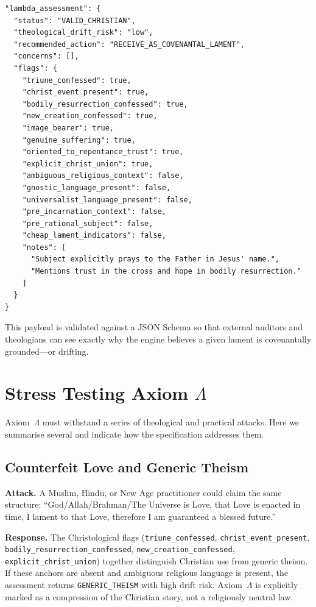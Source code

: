 \documentclass[11pt]{article}
\begin{document}
\begin{verbatim}
"lambda_assessment": {
  "status": "VALID_CHRISTIAN",
  "theological_drift_risk": "low",
  "recommended_action": "RECEIVE_AS_COVENANTAL_LAMENT",
  "concerns": [],
  "flags": {
    "triune_confessed": true,
    "christ_event_present": true,
    "bodily_resurrection_confessed": true,
    "new_creation_confessed": true,
    "image_bearer": true,
    "genuine_suffering": true,
    "oriented_to_repentance_trust": true,
    "explicit_christ_union": true,
    "ambiguous_religious_context": false,
    "gnostic_language_present": false,
    "universalist_language_present": false,
    "pre_incarnation_context": false,
    "pre_rational_subject": false,
    "cheap_lament_indicators": false,
    "notes": [
      "Subject explicitly prays to the Father in Jesus' name.",
      "Mentions trust in the cross and hope in bodily resurrection."
    ]
  }
}
\end{verbatim}

This payload is validated against a JSON Schema so that external auditors and theologians can see exactly why the engine believes a given lament is covenantally grounded---or drifting.

\section{Stress Testing Axiom $\Lambda$}

Axiom~$\Lambda$ must withstand a series of theological and practical attacks. Here we summarise several and indicate how the specification addresses them.

\subsection{Counterfeit Love and Generic Theism}

\textbf{Attack.} A Muslim, Hindu, or New Age practitioner could claim the same structure: ``God/Allah/Brahman/The Universe is Love, that Love is enacted in time, I lament to that Love, therefore I am guaranteed a blessed future.''

\textbf{Response.} The Christological flags (\texttt{triune\_confessed}, \texttt{christ\_event\_present}, \texttt{bodily\_resurrection\_confessed}, \texttt{new\_creation\_confessed}, \texttt{explicit\_christ\_union}) together distinguish Christian use from generic theism. If these anchors are absent and ambiguous religious language is present, the assessment returns \texttt{GENERIC\_THEISM} with high drift risk. Axiom~$\Lambda$ is explicitly marked as a compression of the Christian story, not a religiously neutral law.
\end{document}
